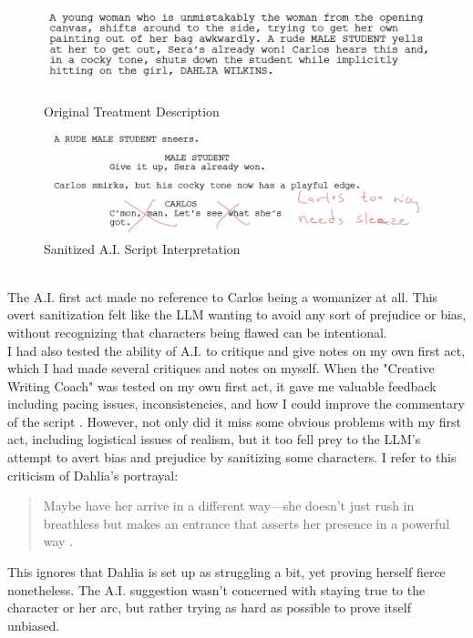 \documentclass[sigconf]{acmart}
\begin{document}
\begin{figure}[!hbt]
    \centering
    \begin{minipage}{0.2\textwidth}
        \includegraphics[width=1.0\linewidth]{OGTreatment.png}
        \caption{Original Treatment Description}
        \label{fig:treatment-excerpt}
    \end{minipage}\hfill
    \begin{minipage}{0.2\textwidth}
        \includegraphics[width=1.0\linewidth]{BadAI.png}
        \caption{Sanitized A.I. Script Interpretation}
        \label{fig:ai-excerpt}
    \end{minipage}
\end{figure}\\
The A.I. first act made no reference to Carlos being a womanizer at all. This overt sanitization felt like the LLM wanting to avoid any sort of prejudice or bias, without recognizing that characters being flawed can be intentional.\\
\indent I had also tested the ability of A.I. to critique and give notes on my own first act, which I had made several critiques and notes on myself. When the "Creative Writing Coach" was tested on my own first act, it gave me valuable feedback including pacing issues, inconsistencies, and how I could improve the commentary of the script \cite{chatgpt}. However, not only did it miss some obvious problems with my first act, including logistical issues of realism, but it too fell prey to the LLM's attempt to avert bias and prejudice by sanitizing some characters. I refer to this criticism of Dahlia's portrayal:
\begin{quote}
    Maybe have her arrive in a different way—she doesn’t just rush in breathless but makes an entrance that asserts her presence in a powerful way \cite{chatgpt}.
\end{quote}
This ignores that Dahlia is set up as struggling a bit, yet proving herself fierce nonetheless. The A.I. suggestion wasn't concerned with staying true to the character or her arc, but rather trying as hard as possible to prove itself unbiased.\\
\end{document}

